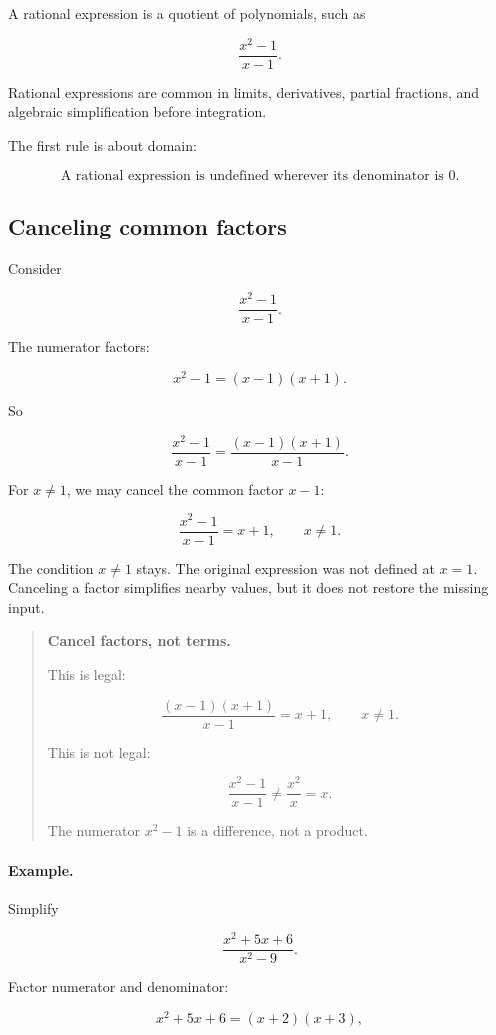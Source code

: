 A rational expression is a quotient of polynomials, such as

\[
\frac{x^2-1}{x-1}.
\]

Rational expressions are common in limits, derivatives, partial fractions, and algebraic
simplification before integration.

The first rule is about domain:

\[
\boxed{
\text{A rational expression is undefined wherever its denominator is \(0\).}
}
\]

\subsection{Canceling common factors}
\label{appsubsec:canceling-common-factors}

Consider

\[
\frac{x^2-1}{x-1}.
\]

The numerator factors:

\[
x^2-1=(x-1)(x+1).
\]

So

\[
\frac{x^2-1}{x-1}
=
\frac{(x-1)(x+1)}{x-1}.
\]

For \(x\neq1\), we may cancel the common factor \(x-1\):

\[
\boxed{
\frac{x^2-1}{x-1}=x+1,
\qquad x\neq1.
}
\]

The condition \(x\neq1\) stays.  The original expression was not defined at \(x=1\).
Canceling a factor simplifies nearby values, but it does not restore the missing input.

\begin{quote}
\textbf{Cancel factors, not terms.}

This is legal:

\[
\frac{(x-1)(x+1)}{x-1}=x+1,
\qquad x\neq1.
\]

This is not legal:

\[
\frac{x^2-1}{x-1}\neq \frac{x^2}{x}=x.
\]

The numerator \(x^2-1\) is a difference, not a product.
\end{quote}

\paragraph{Example.}
Simplify

\[
\frac{x^2+5x+6}{x^2-9}.
\]

Factor numerator and denominator:

\[
x^2+5x+6=(x+2)(x+3),
\]

